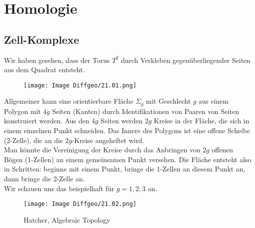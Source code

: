 \documentclass[fleqn, 12pt, letterpaper]{article}
\begin{document}
\section{Homologie}

\subsection{Zell-Komplexe}

Wir haben gesehen, dass der Torus \( T^2 \) durch Verkleben gegenüberliegender Seiten aus dem Quadrat entsteht.

 \begin{figure}[H]
    \centering
    \texttt{[image: Image Diffgeo/21.01.png]}

 \end{figure}

Allgemeiner kann eine orientierbare Fläche \( \Sigma_g \) mit Geschlecht \( g \) aus einem Polygon mit $4g$ Seiten (Kanten) durch Identifikationen von Paaren von Seiten konstruiert werden. Aus den \( 4g \) Seiten werden $2g$ Kreise in der Fläche, die sich in einem einzelnen Punkt schneiden. Das Innere des Polygons ist eine offene Scheibe (2-Zelle), die an die \( 2g \)-Kreise angeheftet wird.\\

Man könnte die Vereinigung der Kreise durch das Anbringen von \( 2g \) offenen Bögen (1-Zellen) an einem gemeinsamen Punkt versehen. Die Fläche entsteht also in Schritten: beginne mit einem Punkt, bringe die 1-Zellen an diesem Punkt an, dann bringe die 2-Zelle an.\\

Wir schauen uns das beispielhaft für \( g = 1, 2, 3 \) an.

\begin{figure}[H]
    \centering
    \texttt{[image: Image Diffgeo/21.02.png]}
    \caption{Hatcher, Algebraic Topology}
 \end{figure}
\end{document}

